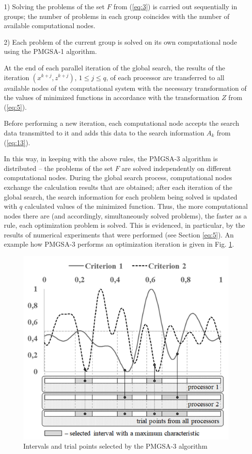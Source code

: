 \documentclass[review]{elsarticle}
\begin{document}
1) Solving the problems of the set $F$ from (\ref{eq:3}) is carried out sequentially in groups; the number of problems in each group coincides with the number of available computational nodes.

2) Each problem of the current group is solved on its own computational node using the PMGSA-1 algorithm.

At the end of each parallel iteration of the global search, the results of the iteration $(x^{k+j}, z^{k+j})$, $1 \leq j \leq q$, of each processor are transferred to all available nodes of the computational system with the necessary transformation of the values of minimized functions in accordance with the transformation $Z$ from (\ref{eq:5}).
		
Before performing a new iteration, each computational node accepts the search data transmitted to it and adds this data to the search information $A_k$ from (\ref{eq:13}).
	
In this way, in keeping with the above rules, the PMGSA-3 algorithm is distributed -- the problems of the set $F$ are solved independently on different computational nodes. During the global search process, computational nodes exchange the calculation results that are obtained; after each iteration of the global search, the search information for each problem being solved is updated with $q$ calculated values of the minimized function. Thus, the more computational nodes there are (and accordingly, simultaneously solved problems), the faster as a rule, each optimization problem is solved. This is evidenced, in particular, by the results of numerical experiments that were performed (see Section \ref{eq:5}). An example how PMGSA-3 performs an optimization iteration is given in Fig. \ref{fig:4}.

\begin{figure}
  \centering
  \includegraphics[width=0.7\linewidth]{fig4}
  \caption{Intervals and trial points selected by the PMGSA-3 algorithm}
  \label{fig:4}
\end{figure}
\end{document}
